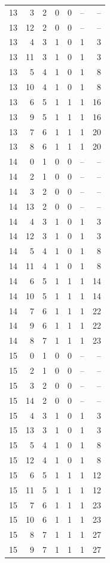 \begin{longtable}{rrrrrrr}
13 & 3 & 2 & 0 & 0 & -- & --\\
13 & 12 & 2 & 0 & 0 & -- & --\\
13 & 4 & 3 & 1 & 0 & 1 & 3\\
13 & 11 & 3 & 1 & 0 & 1 & 3\\
13 & 5 & 4 & 1 & 0 & 1 & 8\\
13 & 10 & 4 & 1 & 0 & 1 & 8\\
13 & 6 & 5 & 1 & 1 & 1 & 16\\
13 & 9 & 5 & 1 & 1 & 1 & 16\\
13 & 7 & 6 & 1 & 1 & 1 & 20\\
13 & 8 & 6 & 1 & 1 & 1 & 20\\
14 & 0 & 1 & 0 & 0 & -- & --\\
14 & 2 & 1 & 0 & 0 & -- & --\\
14 & 3 & 2 & 0 & 0 & -- & --\\
14 & 13 & 2 & 0 & 0 & -- & --\\
14 & 4 & 3 & 1 & 0 & 1 & 3\\
14 & 12 & 3 & 1 & 0 & 1 & 3\\
14 & 5 & 4 & 1 & 0 & 1 & 8\\
14 & 11 & 4 & 1 & 0 & 1 & 8\\
14 & 6 & 5 & 1 & 1 & 1 & 14\\
14 & 10 & 5 & 1 & 1 & 1 & 14\\
14 & 7 & 6 & 1 & 1 & 1 & 22\\
14 & 9 & 6 & 1 & 1 & 1 & 22\\
14 & 8 & 7 & 1 & 1 & 1 & 23\\
15 & 0 & 1 & 0 & 0 & -- & --\\
15 & 2 & 1 & 0 & 0 & -- & --\\
15 & 3 & 2 & 0 & 0 & -- & --\\
15 & 14 & 2 & 0 & 0 & -- & --\\
15 & 4 & 3 & 1 & 0 & 1 & 3\\
15 & 13 & 3 & 1 & 0 & 1 & 3\\
15 & 5 & 4 & 1 & 0 & 1 & 8\\
15 & 12 & 4 & 1 & 0 & 1 & 8\\
15 & 6 & 5 & 1 & 1 & 1 & 12\\
15 & 11 & 5 & 1 & 1 & 1 & 12\\
15 & 7 & 6 & 1 & 1 & 1 & 23\\
15 & 10 & 6 & 1 & 1 & 1 & 23\\
15 & 8 & 7 & 1 & 1 & 1 & 27\\
15 & 9 & 7 & 1 & 1 & 1 & 27\\

\end{longtable}
